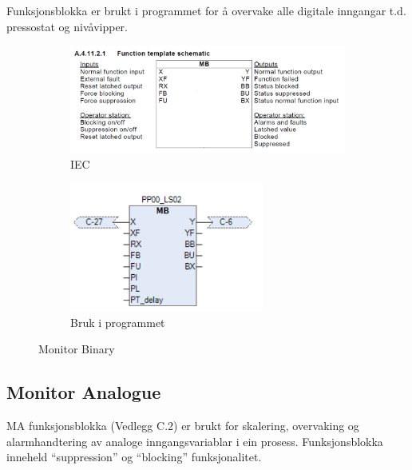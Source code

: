 Funksjonsblokka er brukt i programmet for å overvake alle digitale inngangar t.d. pressostat og nivåvipper.


\begin{figure}[htbp]
    \centering
    \begin{subfigure}[b]{0.45\textwidth}
        \centering
        \includegraphics[width=1\textwidth]{Bilder/MBBlokkIEC.png}
        \caption{IEC}\label{fig:Monitor Binary blokk IEC}
    \end{subfigure}
    \hfill
    \begin{subfigure}[b]{0.45\textwidth}
        \centering
        \includegraphics[width=0.7\textwidth]{Bilder/MBBlokkIProgrammet.png}
        \caption{Bruk i programmet}\label{fig:Monitor Binary blokk i programmet}
    \end{subfigure}
    \caption{Monitor Binary}\label{fig:Monitor Binary}
\end{figure}

\subsection{Monitor Analogue}
\gls{MA} funksjonsblokka (Vedlegg C.2) er brukt for skalering, overvaking og alarmhandtering av \newline
analoge inngangsvariablar i ein prosess.
Funksjonsblokka inneheld ``suppression'' og ``blocking'' funksjonalitet.

